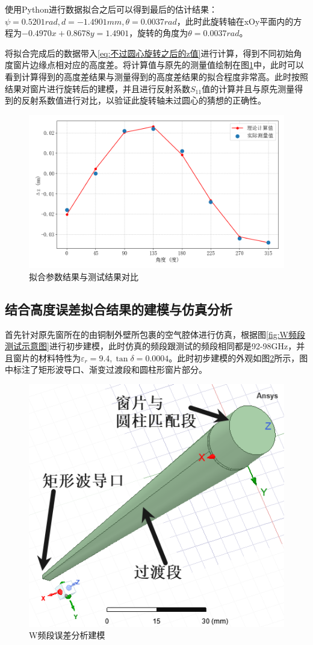 \documentclass[master]{thesis-uestc}
\begin{document}
使用Python进行数据拟合之后可以得到最后的估计结果：\(\psi = 0.5201 rad, d = -1.4901 mm , \theta = 0.0037 rad\)，此时此旋转轴在xOy平面内的方程为\(-0.4970 x + 0.8678 y = 1.4901\)，旋转的角度为\(\theta = 0.0037 rad\)。

将拟合完成后的数据带入\ref{eq:不过圆心旋转之后的z值}进行计算，得到不同初始角度窗片边缘点相对应的高度差。将计算值与原先的测量值绘制在图\ref{fig:测量z值与计算z值}中，此时可以看到计算得到的高度差结果与测量得到的高度差结果的拟合程度非常高。此时按照结果对窗片进行旋转后的建模，并且进行反射系数\(S_{11}\)值的计算并且与原先测量得到的反射系数值进行对比，以验证此旋转轴未过圆心的猜想的正确性。
\begin{figure}[!htb]
    \centering
    \includegraphics[width=0.35\linewidth]{pic/chapter5/不过圆心高度差拟合.png}
    \caption{拟合参数结果与测试结果对比}
    \label{fig:测量z值与计算z值}
\end{figure}

\subsection{结合高度误差拟合结果的建模与仿真分析}
首先针对原先窗所在的由铜制外壁所包裹的空气腔体进行仿真，根据图\ref{fig:W频段测试示意图}进行初步建模，此时仿真的频段跟测试的频段相同都是92-98GHz，并且窗片的材料特性为\(\varepsilon_r = 9.4, \tan \delta = 0.0004\)。此时初步建模的外观如图\ref{fig:W波段误差分析建模}所示，图中标注了矩形波导口、渐变过渡段和圆柱形窗片部分。
\begin{figure}[!htb]
    \centering
    \includegraphics[width=0.25\linewidth]{pic/chapter5/W频段误差分析建模.png}
    \caption{W频段误差分析建模}
    \label{fig:W波段误差分析建模}
\end{figure}
\end{document}
